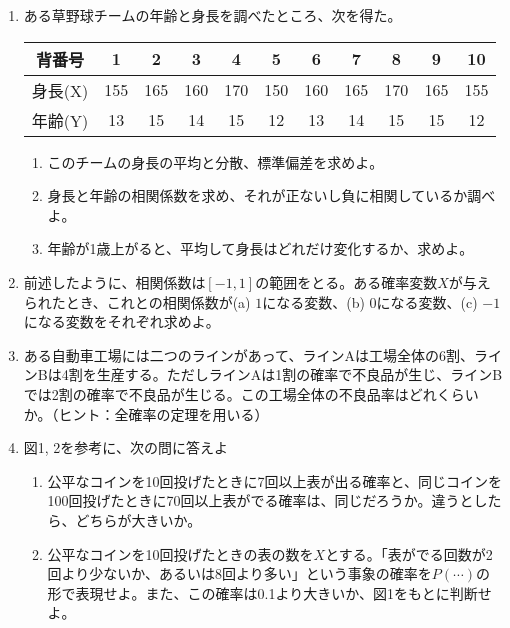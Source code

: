 \documentclass{jsarticle}
\begin{document}
\begin{enumerate}
 \item ある草野球チームの年齢と身長を調べたところ、次を得た。
\begin{center}
\begin{tabular}[t]{ccccccccccc}
 背番号  & 1   & 2   & 3   & 4   & 5   & 6   & 7   & 8   & 9   & 10   \\ \hline 
 身長(X) & 155 & 165 & 160 & 170 & 150 & 160 & 165 & 170 & 165 & 155  \\
 年齢(Y) & 13  & 15  & 14  & 15  & 12  & 13  & 14  & 15  & 15  & 12 
\end{tabular}
\end{center}
\begin{enumerate}
 \item このチームの身長の平均と分散、標準偏差を求めよ。
 \item 身長と年齢の相関係数を求め、それが正ないし負に相関しているか調べよ。
 \item 年齢が1歳上がると、平均して身長はどれだけ変化するか、求めよ。
\end{enumerate}
\vspace{1em}

\item 
前述したように、相関係数は$[-1,1]$の範囲をとる。ある確率変数$X$が与えられたとき、これとの相関係数が(a) $1$になる変数、(b) $0$になる変数、(c) $-1$になる変数をそれぞれ求めよ。

\item ある自動車工場には二つのラインがあって、ラインAは工場全体の6割、ラインBは4割を生産する。ただしラインAは1割の確率で不良品が生じ、ラインBでは2割の確率で不良品が生じる。この工場全体の不良品率はどれくらいか。（ヒント：全確率の定理を用いる）
\vspace{1em}

 \item 図1, 2を参考に、次の問に答えよ
\begin{enumerate}
 \item 公平なコインを10回投げたときに7回以上表が出る確率と、同じコインを100回投げたときに70回以上表がでる確率は、同じだろうか。違うとしたら、どちらが大きいか。
 \item 公平なコインを10回投げたときの表の数を$X$とする。「表がでる回数が2回より少ないか、あるいは8回より多い」という事象の確率を$P(\cdots)$の形で表現せよ。また、この確率は0.1より大きいか、図1をもとに判断せよ。
\end{enumerate}
       
\end{enumerate}
\end{document}
